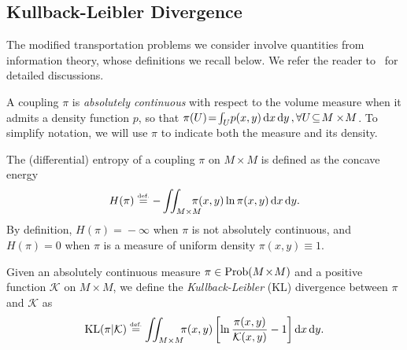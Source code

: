 
\subsection{Kullback-Leibler Divergence}

The modified transportation problems we consider involve quantities from information theory, whose definitions we recall below.  We refer the reader to~\cite{cover-2006} for detailed discussions.

A coupling $\pi$ is \emph{absolutely continuous} with respect to the volume measure when it admits a density function $p$, so that
$\pi(U) \!=\! \smash{\int_U} p(x,y)\,\mathrm{d} x\,\mathrm{d} y\,, \forall U\!\subseteq\!M\times\!M$. To simplify notation, we will use $\pi$ to indicate both the measure and its density.

The (differential) entropy of a coupling $\pi$ on $M\!\times\!M$ is defined as the concave energy
\begin{equation}
\label{eq:Entropy}
H(\pi) \eqdef - \iint_{M\times M} \hspace{-.15in} \pi(x,y)\ln \pi(x,y)\,\dx\,\dy.
\end{equation}
By definition, $H(\pi)\!=\!-\infty$ when $\pi$ is not absolutely continuous, and $H(\pi)\!=\!0$ when $\pi$ is a measure of uniform density $\pi(x,y)\!\equiv\!1$.%


Given an absolutely continuous measure $\pi \in \mathrm{Prob}(M\!\times\!M)$ and a positive function $\mathcal{K}$ on $M\!\times\!M$, we define the \emph{Kullback-Leibler} (KL) divergence between $\pi$ and $\mathcal{K}$ as
\begin{equation}
\label{eq:KL}
\KL(\pi|\mathcal{K}) \eqdef \iint_{M\times M}\!\!\! \pi(x,y)\left[\ln \frac{\pi(x,y)}{\mathcal{K}(x,y)}-1\right] \dx\,\dy.
\end{equation} 

